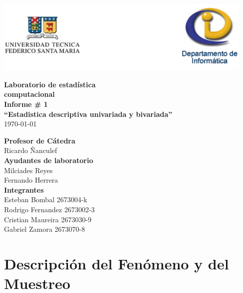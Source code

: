 \documentclass[letterpaper,spanish,11pt]{article}
\begin{document}
\begin{titlepage}
\begin{center}
\includegraphics[height=3.5cm]{logo_latex}  %
\end{center}
\vspace{1.5cm}
\begin{center}
\textbf{\Huge{Laboratorio de estad\'istica}}\\[0.2cm]
\textbf{\Huge{computacional}}\\[0.7cm]
\textbf{\huge{Informe \# 1}}\\[0.7cm]
\textbf{\huge{``Estadistica descriptiva univariada y bivariada''}}\\[0.3cm] %
\today\\[1.5cm]
\end{center}
\begin{flushright}
\large{\textbf{Profesor de C\'atedra}} \\
\large{Ricardo \~{N}anculef} \\[0.5cm]
\large{\textbf{Ayudantes de laboratorio}}\\
\large{Milciades Reyes}\\
\large{Fernando Herrera}\\[0.5cm]

\large{\textbf{Integrantes}} \\
\large{Esteban Bombal 2673004-k} \\
\large{Rodrigo Fernandez 2673002-3} \\
\large{Cristian Maureira 2673030-9} \\
\large{Gabriel Zamora 2673070-8} \\
\end{flushright}
\end{titlepage}

\section*{Descripci\'on del Fen\'omeno y del Muestreo}
\end{document}
